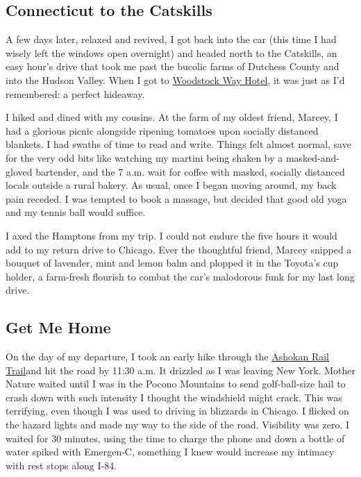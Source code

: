 \hypertarget{connecticut-to-the-catskills}{%
\subsection{Connecticut to the
Catskills}\label{connecticut-to-the-catskills}}

A few days later, relaxed and revived, I got back into the car (this
time I had wisely left the windows open overnight) and headed north to
the Catskills, an easy hour's drive that took me past the bucolic farms
of Dutchess County and into the Hudson Valley. When I got to
\href{https://www.woodstockway.com/}{Woodstock Way Hotel}, it was just
as I'd remembered: a perfect hideaway.

I hiked and dined with my cousins. At the farm of my oldest friend,
Marcey, I had a glorious picnic alongside ripening tomatoes upon
socially distanced blankets. I had swaths of time to read and write.
Things felt almost normal, save for the very odd bits like watching my
martini being shaken by a masked-and-gloved bartender, and the 7 a.m.
wait for coffee with masked, socially distanced locals outside a rural
bakery. As usual, once I began moving around, my back pain receded. I
was tempted to book a massage, but decided that good old yoga and my
tennis ball would suffice.

I axed the Hamptons from my trip. I could not endure the five hours it
would add to my return drive to Chicago. Ever the thoughtful friend,
Marcey snipped a bouquet of lavender, mint and lemon balm and plopped it
in the Toyota's cup holder, a farm-fresh flourish to combat the car's
malodorous funk for my last long drive.

\hypertarget{get-me-home}{%
\subsection{Get Me Home}\label{get-me-home}}

On the day of my departure, I took an early hike through the
\href{https://ashokanrailtrail.com/}{Ashokan Rail Trail}and hit the road
by 11:30 a.m. It drizzled as I was leaving New York. Mother Nature
waited until I was in the Pocono Mountains to send golf-ball-size hail
to crash down with such intensity I thought the windshield might crack.
This was terrifying, even though I was used to driving in blizzards in
Chicago. I flicked on the hazard lights and made my way to the side of
the road. Visibility was zero. I waited for 30 minutes, using the time
to charge the phone and down a bottle of water spiked with Emergen-C,
something I knew would increase my intimacy with rest stops along I-84.

